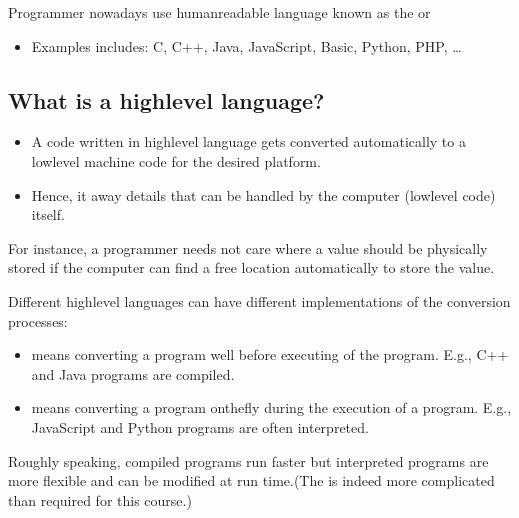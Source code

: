 \documentclass[letterpaper,10pt,english]{sphinxmanual}
\begin{document}
Programmer nowadays use human\sphinxhyphen{}readable language known as the  or 
\begin{itemize}
\item {} 
Examples includes: C, C++, Java, JavaScript, Basic, Python, PHP, …

\end{itemize}


\subsection{What is a high\sphinxhyphen{}level language?}
\label{\detokenize{Lecture1/Introduction to Computer Programming:what-is-a-high-level-language}}\begin{itemize}
\item {} 
A code written in high\sphinxhyphen{}level language gets converted automatically to a low\sphinxhyphen{}level machine code for the desired platform.

\item {} 
Hence, it  away details that can be handled by the computer (low\sphinxhyphen{}level code) itself.

\end{itemize}

For instance, a programmer needs not care where a value should be physically stored if the computer can find a free location automatically to store the value.

Different high\sphinxhyphen{}level languages can have different implementations of the conversion processes:
\begin{itemize}
\item {} 
 means converting a program well before executing of the program. E.g., C++ and Java programs are compiled.

\item {} 
 means converting a program on\sphinxhyphen{}the\sphinxhyphen{}fly during the execution of a program. E.g., JavaScript and Python programs are often interpreted.

\end{itemize}

Roughly speaking, compiled programs run faster but interpreted programs are more flexible and can be modified at run time.(The  is indeed more complicated than required for this course.)
\end{document}
